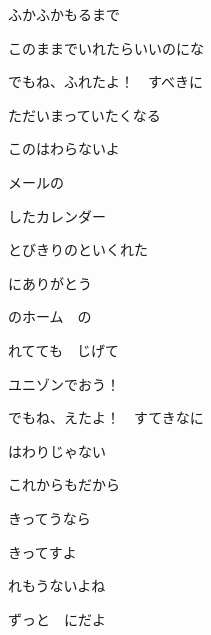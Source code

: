 ふかふかもるまで

このままでいれたらいいのにな

\bigskip

でもね、ふれたよ！　すべきに

ただいまっていたくなる

このはわらないよ

メールの

したカレンダー

とびきりのといくれた

にありがとう

\bigskip

のホーム　の

れてても　じげて

ユニゾンでおう！

\bigskip

でもね、えたよ！　すてきなに

はわりじゃない

これからもだから

きってうなら

きってすよ

れもうないよね

ずっと　にだよ
